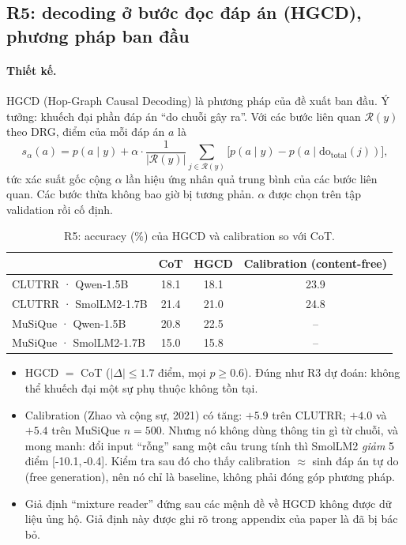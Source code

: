 \documentclass[11pt]{article}
\newcommand{\dt}{\mathrm{do}_{\text{total}}}
\newcommand{\ci}[2]{{\scriptsize[#1,\,#2]}}
\begin{document}
\subsection{R5: decoding ở bước đọc đáp án (HGCD), phương pháp ban đầu}

\paragraph{Thiết kế.} HGCD (Hop-Graph Causal Decoding) là phương pháp của đề xuất ban đầu. Ý tưởng:
khuếch đại phần đáp án ``do chuỗi gây ra''. Với các bước liên quan $\mathcal{R}(y)$ theo DRG, điểm
của mỗi đáp án $a$ là
\[
s_\alpha(a)=p(a\mid y)+\alpha\cdot\frac{1}{|\mathcal{R}(y)|}\sum_{j\in\mathcal{R}(y)}
\big[p(a\mid y)-p(a\mid\dt(j))\big],
\]
tức xác suất gốc cộng $\alpha$ lần hiệu ứng nhân quả trung bình của các bước liên quan. Các bước
thừa không bao giờ bị tương phản. $\alpha$ được chọn trên tập validation rồi cố định.

\begin{table}[h]
\centering\small
\caption{R5: accuracy (\%) của HGCD và calibration so với CoT.}
\label{tab:r5}
\begin{tabular}{lccc}
\toprule
 & CoT & HGCD & Calibration (content-free) \\
\midrule
CLUTRR · Qwen-1.5B & 18.1 & 18.1 & 23.9 \\
CLUTRR · SmolLM2-1.7B & 21.4 & 21.0 & 24.8 \\
MuSiQue · Qwen-1.5B & 20.8 & 22.5 & -- \\
MuSiQue · SmolLM2-1.7B & 15.0 & 15.8 & -- \\
\bottomrule
\end{tabular}
\end{table}

\begin{cachdoc}
\begin{itemize}[leftmargin=*,itemsep=1pt]
\item HGCD $=$ CoT ($|\Delta|\le 1.7$ điểm, mọi $p\ge 0.6$). Đúng như R3 dự đoán: không thể khuếch
  đại một sự phụ thuộc không tồn tại.
\item Calibration (Zhao và cộng sự, 2021) có tăng: $+5.9$ trên CLUTRR; $+4.0$ và $+5.4$ trên
  MuSiQue $n=500$. Nhưng nó không dùng thông tin gì từ chuỗi, và mong manh: đổi input ``rỗng''
  sang một câu trung tính thì SmolLM2 \emph{giảm} 5 điểm \ci{-10.1}{-0.4}. Kiểm tra sau đó cho thấy
  calibration $\approx$ sinh đáp án tự do (free generation), nên nó chỉ là baseline, không phải
  đóng góp phương pháp.
\item Giả định ``mixture reader'' đứng sau các mệnh đề về HGCD không được dữ liệu ủng hộ. Giả định
  này được ghi rõ trong appendix của paper là đã bị bác bỏ.
\end{itemize}
\end{cachdoc}
\end{document}
